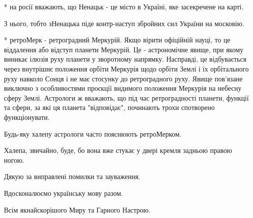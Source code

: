 * на росії вважають, що Ненацьк - це місто в Україні, яке засекречене на карті. 

З нього, тобто зНенацька піде контр-наступ збройних сил України на московію. 

* ретроМерк - ретроградний Меркурій. Якщо вірити офіційній науці, то це
віддалення або відступ планети Меркурій. Це - астрономічне явище, при якому
виникає ілюзія руху планети у зворотному напрямку. Насправді, це відбувається
через внутрішнє положення орбіти Меркурія щодо орбіти Землі і їх орбітального
руху навколо Сонця і не має стосунку до ретроградного руху. Явище пов'язане
виключно з особливостями проєкції видимого положення Меркурія на небесну сферу
Землі. Астрологи ж вважають, що під час ретроградності планети, функції та
сфери, за які ця планета "відповідає", починають трохи спотворено
функціонувати. 

Будь-яку халепу астрологи часто пояснюють ретроМерком. 

Халепа, звичайно, буде, бо вона вже стукає у двері кремля задньою правою ногою. 

Дякую за виправлені помилки та зауваження. 

Вдосконалюємо українську мову разом. 

Всім якнайскорішого Миру та Гарного Настрою.


